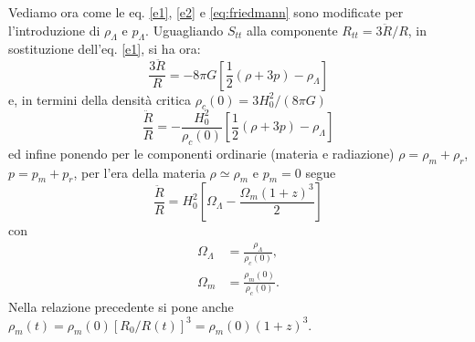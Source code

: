 Vediamo ora come le eq. \eqref{e1}, \eqref{e2} e \eqref{eq:friedmann} sono
modificate per l'introduzione di $\rho_{\Lambda}$ e $p_{\Lambda}$.  Uguagliando
$S_{tt}$ alla componente $R_{tt}= 3 \ddot{R}/R$, in sostituzione
dell'eq. \eqref{e1}, si ha ora:
\begin{equation}
  \frac{3 \ddot{R}}{R} = - 8\pi G \left[ \frac{1}{2}  (\rho+3p) - \rho_{\Lambda}
  \right]
  \label{ecc1}
\end{equation}
e, in termini della densità critica $\rho_c(0)=3H_0^2/(8\pi G)$
\begin{equation}
  \frac {\ddot{R}} {R} = - \frac {H_0^2} {\rho_c(0)}
  \left[
    \frac {1}{2}  (\rho+3p) - \rho_{\Lambda}
  \right]
\label{2.63}
\end{equation}
ed infine ponendo per le componenti ordinarie (materia e radiazione)
$\rho=\rho_m+\rho_r$, $p=p_m+p_r$, per l'era della materia $\rho
\simeq \rho_m$ e $p_m=0$ segue
\begin{equation}
  \label{ddRcc}
  \frac {\ddot{R}} {R} = H_0^2
  \left[ \Omega_{\Lambda} -\frac{\Omega_m (1+z)^3}{2} \right]
\end{equation}
con
\begin{subequations}
  \begin{align}
    \Omega_{\Lambda} &= \frac{\rho_{\Lambda}}{\rho_c(0)}, \\
    \Omega_m       &= \frac{\rho_m(0)}{\rho_c(0)}.
  \end{align}
\end{subequations}
Nella relazione precedente si pone anche $\rho_m(t)=\rho_m(0) [R_0/R(t)]^3 = \rho_m(0) (1+z)^3$.

